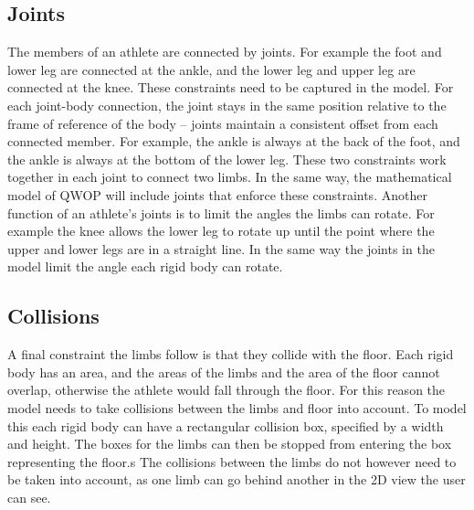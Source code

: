 \documentclass[12pt,a4paper,twoside,openright]{report}
\begin{document}
\subsection{Joints}
\label{sub:joints}

The members of an athlete are connected by joints. For example the foot and lower leg are connected at the ankle, and the lower leg and upper leg are connected at the knee.
These constraints need to be captured in the model.
For each joint-body connection, the joint stays in the same position relative to the frame of reference of the body -- joints maintain a consistent offset from each connected member. For example, the ankle is always at the back of the foot, and the ankle is always at the bottom of the lower leg. These two constraints work together in each joint to connect two limbs.
In the same way, the mathematical model of QWOP will include joints that enforce these constraints.
Another function of an athlete's joints is to limit the angles the limbs can rotate. For example the knee allows the lower leg to rotate up until the point where the upper and lower legs are in a straight line. In the same way the joints in the model limit the angle each rigid body can rotate.

\subsection{Collisions}
\label{sub:collisions}
A final constraint the limbs follow is that they collide with the floor.
Each rigid body has an area, and the areas of the limbs and the area of the floor cannot overlap, otherwise the athlete would fall through the floor.
For this reason the model needs to take collisions between the limbs and floor into account.
To model this each rigid body can have a rectangular collision box, specified by a width and height.
The boxes for the limbs can then be stopped from entering the box representing the floor.s
The collisions between the limbs do not however need to be taken into account, as one limb can go behind another in the 2D view the user can see.
\end{document}
